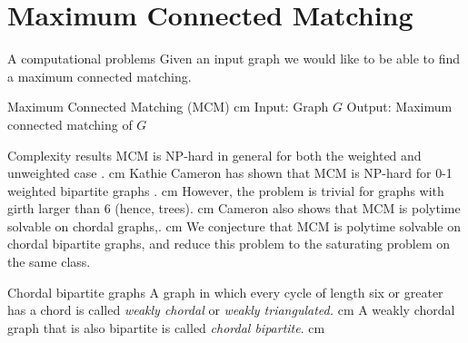 \documentclass{beamer}
\newcommand{\bframe}[2]{\begin{frame}{#1}#2\end{frame}}
\begin{document}
\section{Maximum Connected Matching}

\bframe{A computational problems}{
	Given an input graph we would like to be able to find a maximum connected matching.\pause
 	\begin{framed}
  		Maximum Connected Matching (MCM)
  		\vskip 0.25 cm Input: Graph $G$
  		\newline Output: Maximum connected matching of $G$
 	\end{framed}
}

\bframe{Complexity results}{
	MCM is NP-hard in general for both the weighted and unweighted case \cite{MR2070161}. \pause\vskip 0.5 cm
	 Kathie Cameron has shown that MCM is NP-hard for 0-1 weighted bipartite graphs \cite{MR2163948}.\pause\vskip 0.5 cm
	 However, the problem is trivial for graphs with girth larger than 6 (hence, trees).\pause\vskip 0.5 cm
	Cameron also shows that MCM is polytime solvable on chordal graphs,.\pause \vskip 0.5 cm
 	We conjecture that MCM is polytime solvable on chordal bipartite graphs, and reduce this problem to the saturating problem on the same class.}
	 
\bframe{Chordal bipartite graphs}{
A graph in which every cycle of length six or greater has a chord is called {\it weakly chordal} or {\it weakly triangulated.}
\pause\vskip 0.5 cm
A weakly chordal graph that is also bipartite is called {\it chordal bipartite}.\pause\vskip 0.5 cm
\begin{center}  \end{center}
}
\end{document}
